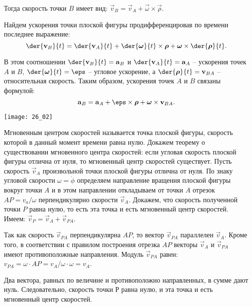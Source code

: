 Тогда скорость точки \( B \) имеет вид: \( \vec{v}_B = \vec{v}_A +
\vec{\omega}\times\vec{\rho} \).

Найдем ускорения точки плоской фигуры продифференцировав по времени последнее
выражение:
\[
    \der{\vec{v}_B}{t} = \der{\vec{v}_A}{t} + \der{\vec{\omega}}{t}\times
    \vec{\rho} + \vec{\omega}\times\der{\vec{\rho}}{t}.
\]
 
В этом соотношении \( \ds \der{\vec{v}_B}{t} = \vec{a}_B \) и
\( \ds \der{\vec{v}_A}{t} = \vec{a}_A \) -- ускорения точек \( A \) и \( B \),
\( \ds \der{\vec{\omega}}{t} = \vec{\eps} \) -- угловое ускорение, а
\( \ds \der{\vec{\rho}}{t} = \vec{v}_{BA} \) -- относительная скорость. Таким
образом, ускорения точек \( A \) и \( B \) связаны формулой:
\[
    \vec{a}_B = \vec{a}_A + \vec{\eps}\times\vec{\rho} +
    \vec{\omega}\times\vec{v}_{BA}.
\]


\begin{minipage}{.4\textwidth}
    \texttt{[image: 26\_02]}
\end{minipage}
\begin{minipage}{.55\textwidth}
Мгновенным центром скоростей называется точка плоской фигуры, скорость которой в
данный момент времени равна нулю. Докажем теорему о существовании мгновенного
центра скоростей: если угловая скорость плоской фигуры отлична от нуля, то
мгновенный центр скоростей существует. Пусть скорость \( \vec{v}_A \)
произвольной точки плоской фигуры отлична от нуля. По знаку угловой скорости
\( \omega = \dot{\phi} \) определяем направление вращения плоской фигуры вокруг
точки \( A \) и в этом направлении откладываем от точки \( A \) отрезок
\( AP = v_a/\omega \) перпендикулярно скорости \( \vec{v}_A \).
Докажем, что скорость полученной точки \( P \) равна нулю, то есть эта точка и
есть мгновенный центр скоростей. Имеем: \( \vec{v}_P = \vec{v}_A +
\vec{v}_{PA} \).
\end{minipage}
 
Так как скорость \( \vec{v}_{PA} \) перпендикулярна \( AP \), то вектор
\( \vec{v}_{PA} \) параллелен \( \vec{v}_A \). Кроме того, в соответствии с
правилом построения отрезка \( AP \) векторы \( \vec{v}_A \) и
\( \vec{v}_{PA} \) имеют противоположные направления. Модуль \( \vec{v}_{PA} \)
равен: \( v_{PA} = \omega\cdot AP = v_A/\omega\cdot\omega = v_A \).

Два вектора, равных по величине и противоположно направленных, в сумме дают нуль.
Следовательно, скорость точки Р равна нулю, и эта точка и есть мгновенный центр
скоростей.

\newpage %
